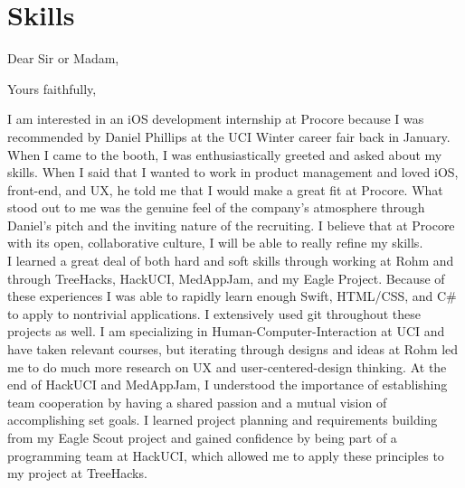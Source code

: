 \documentclass[11pt,letterpaper,sans,english]{moderncv}        %
\begin{document}
\section{Skills}
\clearpage
\date{\today}
\opening{Dear Sir or Madam,}
\closing{Yours faithfully,}
\makelettertitle
I am interested in an iOS development internship at Procore because I was recommended by Daniel Phillips at the UCI Winter career fair back in January. When I came to the booth, I was enthusiastically greeted and asked about my skills. When I said that I wanted to work in product management and loved iOS, front-end, and UX, he told me that I would make a great fit at Procore. What stood out to me was the genuine feel of the company's atmosphere through Daniel's pitch and the inviting nature of the recruiting. I believe that at Procore with its open, collaborative culture, I will be able to really refine my skills.\\[3mm]
I learned a great deal of both hard and soft skills through working at Rohm and through TreeHacks, HackUCI, MedAppJam, and my Eagle Project. Because of these experiences I was able to rapidly learn enough Swift, HTML/CSS, and C\# to apply to nontrivial applications. I extensively used git throughout these projects as well. I am specializing in Human-Computer-Interaction at UCI and have taken relevant courses, but iterating through designs and ideas at Rohm led me to do much more research on UX and user-centered-design thinking. At the end of HackUCI and MedAppJam, I understood the importance of establishing team cooperation by having a shared passion and a mutual vision of accomplishing set goals. I learned project planning and requirements building from my Eagle Scout project and gained confidence by being part of a programming team at HackUCI, which allowed me to apply these principles to my project at TreeHacks.
\end{document}
